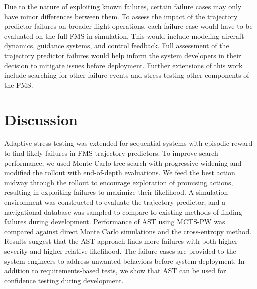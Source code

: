 


Due to the nature of exploiting known failures, certain failure cases may only have minor differences between them.
To assess the impact of the trajectory predictor failures on broader flight operations, each failure case would have to be evaluated on the full FMS in simulation.
This would include modeling aircraft dynamics, guidance systems, and control feedback. 
Full assessment of the trajectory predictor failures would help inform the system developers in their decision to mitigate issues before deployment.
Further extensions of this work include searching for other failure events and stress testing other components of the FMS.


\pagebreak


\section{Discussion}
\label{sec:ast_discussion}
Adaptive stress testing was extended for sequential systems with episodic reward to find likely failures in FMS trajectory predictors.
To improve search performance, we used Monte Carlo tree search with progressive widening and modified the rollout with end-of-depth evaluations.
We feed the best action midway through the rollout to encourage exploration of promising actions, resulting in exploiting failures to maximize their likelihood. 
A simulation environment was constructed to evaluate the trajectory predictor, and a navigational database was sampled to compare to existing methods of finding failures during development.
Performance of AST using MCTS-PW was compared against direct Monte Carlo simulations and the cross-entropy method.
Results suggest that the AST approach finds more failures with both higher severity and higher relative likelihood.
The failure cases are provided to the system engineers to address unwanted behaviors before system deployment.
In addition to requirements-based tests, we show that AST can be used for confidence testing during development.
